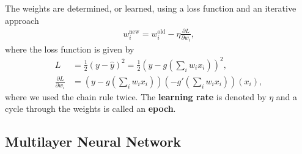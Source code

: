 \documentclass[aspectratio=169,10pt]{beamer}
\begin{document}
\begin{frame}{\secname}{\subsecname}
  The weights are determined, or learned, using a loss function and an iterative approach
  \begin{align}
    w_i^{\text{new}} = w_i^{\text{old}} - \eta \frac{\partial L}{\partial w_i},
  \end{align}
  where the loss function is given by
  \begin{align}
    L &= \frac{1}{2}(y - \hat{y})^2 = \frac{1}{2}\left(y - g\left(\sum_i w_i x_i\right)\right)^2, \\
    \frac{\partial L}{\partial w_i} &= \left(y - g\left(\sum_i w_i x_i\right)\right)\left(-g'\left(\sum_i w_i x_i\right)\right)(x_i),
  \end{align}
  where we used the chain rule twice.
  The \textbf{learning rate} is denoted by $\eta$ and a cycle through the weights is called an \textbf{epoch}.
\end{frame}

\subsection{Multilayer Neural Network}
\end{document}
